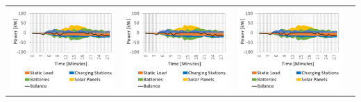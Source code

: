 \begin{table}[b]
\begin{tabularx}{\textwidth}{|Y|Y|Y|Y|}
 		\includegraphics[trim=0 0 0 -3,scale=0.285]{../gfx/data/image002.png} &
		\includegraphics[trim=0 0 0 -3,scale=0.285]{../gfx/data/image002.png} &
		\includegraphics[trim=0 0 0 -3,scale=0.285]{../gfx/data/image002.png}  &

\end{tabularx}
\end{table}

